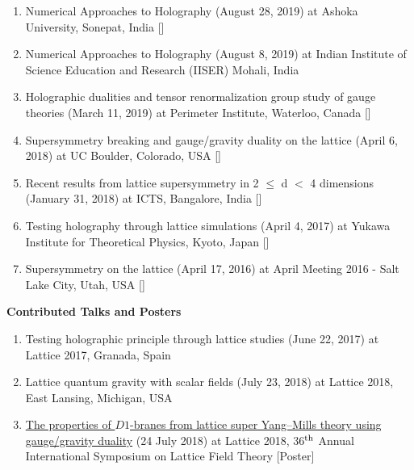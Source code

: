 \begin{enumerate}
 \item Numerical Approaches to Holography (August 28, 2019) at Ashoka University, Sonepat, India [] 
\vspace{1mm} 
 
 \item Numerical Approaches to Holography (August 8, 2019) at Indian Institute of Science Education and Research (IISER) Mohali, India \vspace{1mm} 
 
  \item Holographic dualities and tensor renormalization group study of gauge theories (March 11, 2019) at Perimeter Institute, Waterloo, Canada 
 [] 
\vspace{1mm} 


  \item Supersymmetry breaking and gauge/gravity duality on the lattice (April 6, 2018) at UC Boulder, Colorado, USA 
    [] 
  \vspace{1mm} 
  
  
  \item Recent results from lattice supersymmetry in 2 $\le$ d $<$ 4 dimensions (January 31, 2018) at ICTS, Bangalore, India 
   [] 
  \vspace{1mm} 
  
 \item Testing holography through lattice simulations (April 4, 2017) at Yukawa Institute for Theoretical Physics, Kyoto, Japan
  []  
 \vspace{1mm} 
 
 
\item Supersymmetry on the lattice (April 17, 2016) at April Meeting 2016 - Salt Lake City, Utah, USA 
 [] 
\end{enumerate}



\textcolor{alizarin}{\textbf{\fontsize{10}{38} \bfseries Contributed Talks and Posters}}
\begin{enumerate}
  \item Testing holographic principle through lattice studies (June 22, 2017) at Lattice 2017, Granada, Spain \vspace{1mm} 
  \item Lattice quantum gravity with scalar fields (July 23, 2018) at Lattice 2018, East Lansing, Michigan, USA   
  \item \href{https://indico.fnal.gov/event/15949/session/4/contribution/66}{The properties of $D1$-branes from lattice super Yang--Mills theory using gauge/gravity duality} (24 July 2018) 
 at Lattice 2018, 36$^{\rm{th}}$ Annual International Symposium on Lattice Field Theory [Poster] 
\end{enumerate}
 
